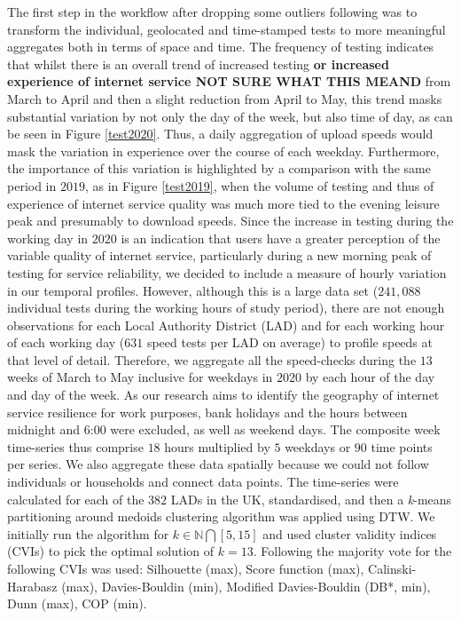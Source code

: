 \documentclass[]{interact}
\theoremstyle{plain}%
\theoremstyle{definition}
\theoremstyle{remark}
\begin{document}
The first step in the workflow after dropping some outliers following
\citet{riddlesden2014broadband} was to transform the individual,
geolocated and time-stamped tests to more meaningful aggregates both in
terms of space and time. The frequency of testing indicates that whilst
there is an overall trend of increased testing \textbf{or increased
experience of internet service NOT SURE WHAT THIS MEAND} from March to
April and then a slight reduction from April to May, this trend masks
substantial variation by not only the day of the week, but also time of
day, as can be seen in Figure \ref{test2020}. Thus, a daily aggregation
of upload speeds would mask the variation in experience over the course
of each weekday. Furthermore, the importance of this variation is
highlighted by a comparison with the same period in \(2019\), as in
Figure \ref{test2019}, when the volume of testing and thus of experience
of internet service quality was much more tied to the evening leisure
peak and presumably to download speeds. Since the increase in testing
during the working day in \(2020\) is an indication that users have a
greater perception of the variable quality of internet service,
particularly during a new morning peak of testing for service
reliability, we decided to include a measure of hourly variation in our
temporal profiles. However, although this is a large data set
(\(241,088\) individual tests during the working hours of study period),
there are not enough observations for each Local Authority District
(LAD) and for each working hour of each working day (\(631\) speed tests
per LAD on average) to profile speeds at that level of detail.
Therefore, we aggregate all the speed-checks during the \(13\) weeks of
March to May inclusive for weekdays in \(2020\) by each hour of the day
and day of the week. As our research aims to identify the geography of
internet service resilience for work purposes, bank holidays and the
hours between midnight and 6:00 were excluded, as well as weekend days.
The composite week time-series thus comprise \(18\) hours multiplied by
\(5\) weekdays or \(90\) time points per series. We also aggregate these
data spatially because we could not follow individuals or households and
connect data points. The time-series were calculated for each of the
\(382\) LADs in the UK, standardised, and then a \emph{k}-means
partitioning around medoids clustering algorithm was applied using DTW.
We initially run the algorithm for \(k \in \mathbb{N} \bigcap [5,15]\)
and used cluster validity indices (CVIs) to pick the optimal solution of
\(k = 13\). Following \citet{sardatime} the majority vote for the
following CVIs was used: Silhouette (max), Score function (max),
Calinski-Harabasz (max), Davies-Bouldin (min), Modified Davies-Bouldin
(DB*, min), Dunn (max), COP (min).
\end{document}
